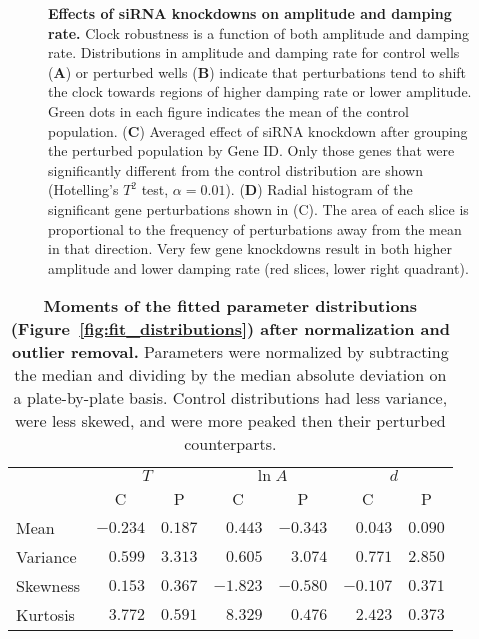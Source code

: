 \documentclass[11pt, letterpaper]{article}
\begin{document}
\begin{figure}[h!]
  \begin{center}
  \end{center}
  \caption{{\bfseries Effects of siRNA knockdowns on amplitude and damping rate.}
  Clock robustness is a function of both amplitude and damping rate.
  Distributions in amplitude and damping rate for control wells ({\bfseries A}) or perturbed wells ({\bfseries B}) indicate that perturbations tend to shift the clock towards regions of higher damping rate or lower amplitude. Green dots in each figure indicates the mean of the control population.
({\bfseries C}) Averaged effect of siRNA knockdown after grouping the perturbed population by Gene ID. Only those genes that were significantly different from the control distribution are shown (Hotelling's $T^2$ test, $\alpha = 0.01$).
({\bfseries D}) Radial histogram of the significant gene perturbations shown in (C). The area of each slice is proportional to the frequency of perturbations away from the mean in that direction. Very few gene knockdowns result in both higher amplitude and lower damping rate (red slices, lower right quadrant).
}
\label{fig:outlier_dist}
\end{figure}

\clearpage

\begin{table}[h!]
  \begin{center}
    \begin{tabular}{lrrrrrr}\toprule
      {} & \multicolumn{2}{c}{$T$} & \multicolumn{2}{c}{$\ln A$} & \multicolumn{2}{c}{$d$} \\
      {}         & \multicolumn{1}{c}{C}         & \multicolumn{1}{c}{P}           & \multicolumn{1}{c}{C}         & \multicolumn{1}{c}{P}               & \multicolumn{1}{c}{C}         & \multicolumn{1}{c}{P}           \\\midrule
      Mean     & $-0.234$ & $0.187$ & $0.443$  & $-0.343$ & $0.043$  & $0.090$    \\
      Variance & $ 0.599$ & $3.313$ & $0.605$  & $ 3.074$ & $0.771$  & $2.850$    \\
      Skewness & $ 0.153$ & $0.367$ & $-1.823$ & $-0.580$ & $-0.107$ & $0.371$    \\
      Kurtosis & $ 3.772$ & $0.591$ & $8.329$  & $ 0.476$ & $2.423$  & $0.373$    \\
      \bottomrule
    \end{tabular}
  \end{center}
  \caption{{\bfseries Moments of the fitted parameter distributions (Figure~\ref{fig:fit_distributions}) after normalization and outlier removal.} Parameters were normalized by subtracting the median and dividing by the median absolute deviation on a plate-by-plate basis. Control distributions had less variance, were less skewed, and were more peaked then their perturbed counterparts.}
  \label{tab:fit_distributions}
\end{table}
\end{document}
